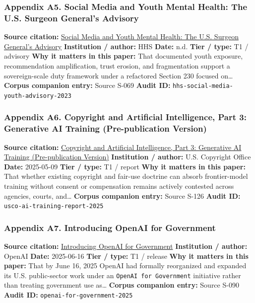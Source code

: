 \documentclass[
  american,
  11pt,
  letterpaper,
]{article}
\begin{document}
\subsubsection{Appendix A5. Social Media and Youth Mental Health: The
U.S. Surgeon General's
Advisory}\label{ch-10-appendix-a5-social-media-and-youth-mental-health-the-u-s-surgeon-general-s-advisory}

\textbf{Source citation:}
\href{https://www.hhs.gov/surgeongeneral/priorities/youth-mental-health/social-media/index.html}{Social
Media and Youth Mental Health: The U.S. Surgeon General's Advisory}
\textbf{Institution / author:} HHS \textbf{Date:} n.d. \textbf{Tier /
type:} T1 / advisory \textbf{Why it matters in this paper:} That
documented youth exposure, recommendation amplification, trust erosion,
and fragmentation support a sovereign-scale duty framework under a
refactored Section 230 focused on\ldots{} \textbf{Corpus companion
entry:} Source S-069 \textbf{Audit ID:}
\texttt{hhs-social-media-youth-advisory-2023}

\subsubsection{Appendix A6. Copyright and Artificial Intelligence, Part
3: Generative AI Training (Pre-publication
Version)}\label{ch-10-appendix-a6-copyright-and-artificial-intelligence-part-3-generative-ai-training-pre-publication-version}

\textbf{Source citation:}
\href{https://copyright.gov/ai/Copyright-and-Artificial-Intelligence-Part-3-Generative-AI-Training-Report-Pre-Publication-Version.pdf}{Copyright
and Artificial Intelligence, Part 3: Generative AI Training
(Pre-publication Version)} \textbf{Institution / author:} U.S. Copyright
Office \textbf{Date:} 2025-05-09 \textbf{Tier / type:} T1 / report
\textbf{Why it matters in this paper:} That whether existing copyright
and fair-use doctrine can absorb frontier-model training without consent
or compensation remains actively contested across agencies, courts,
and\ldots{} \textbf{Corpus companion entry:} Source S-126 \textbf{Audit
ID:} \texttt{usco-ai-training-report-2025}

\subsubsection{Appendix A7. Introducing OpenAI for
Government}\label{ch-10-appendix-a7-introducing-openai-for-government}

\textbf{Source citation:}
\href{https://openai.com/global-affairs/introducing-openai-for-government/}{Introducing
OpenAI for Government} \textbf{Institution / author:} OpenAI
\textbf{Date:} 2025-06-16 \textbf{Tier / type:} T1 / release \textbf{Why
it matters in this paper:} That by June 16, 2025 OpenAI had formally
reorganized and expanded its U.S. public-sector work under an
\texttt{OpenAI\ for\ Government} initiative rather than treating
government use as\ldots{} \textbf{Corpus companion entry:} Source S-090
\textbf{Audit ID:} \texttt{openai-for-government-2025}
\end{document}
